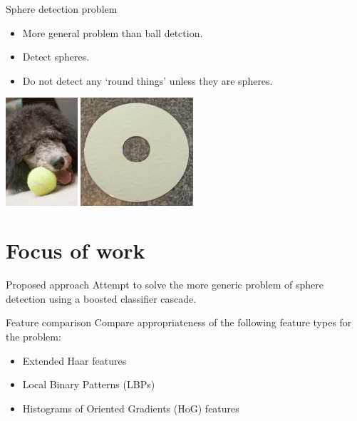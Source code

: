 \documentclass{beamer}
\newcommand{\scarequotes}[1]{`#1'}
\begin{document}
	\begin{frame}{Sphere detection problem}
		\begin{itemize}
			\item More general problem than ball detction.
			\item Detect spheres.
			\item Do not detect any \scarequotes{round things} unless they are spheres.
		\end{itemize}
		\begin{table}[h]
			\centering
			\includegraphics[height=4cm]{training_images/positive/n04409515_2793} \hspace*{0.1cm}
			\includegraphics[height=4cm]{training_images/hard_negative/n03208556_9694}
		\end{table}
	\end{frame}

\section{Focus of work}
	\begin{frame}{Proposed approach}
		Attempt to solve the more generic problem of sphere detection using a boosted classifier cascade.
	\end{frame}

	\begin{frame}{Feature comparison}
		Compare appropriateness of the following feature types for the problem: \par
		\begin{itemize}
			\item Extended Haar features \citep{Lienhart2002extended}
			\item Local Binary Patterns (LBPs) \citep{liao2007learning}
			\item Histograms of Oriented Gradients (HoG) features \citep{dalal2005histograms}
		\end{itemize}
	\end{frame}
\end{document}
